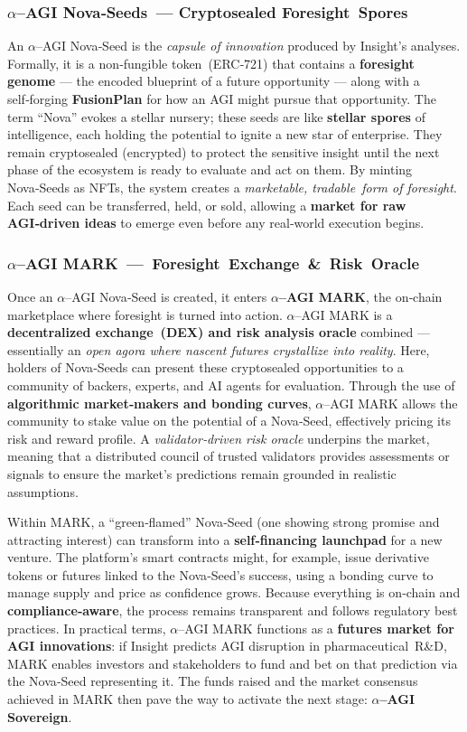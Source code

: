 \documentclass[12pt]{article}
\theoremstyle{plain}
\newcommand{\pdfmath}[2]{\texorpdfstring{$#1$}{#2}}
\newcommand{\AGIalpha}{\pdfmath{\alpha}{alpha}\nobreakdash--AGI\xspace}
\begin{document}
\subsubsection*{\AGIalpha Nova‑Seeds — Cryptosealed Foresight Spores}
An \AGIalpha Nova‑Seed is the \textit{capsule of innovation} produced by
Insight’s analyses.  Formally, it is a non‑fungible token (ERC‑721) that
contains a \textbf{foresight genome} — the encoded blueprint of a future
opportunity — along with a self‑forging \textbf{FusionPlan} for how an AGI
might pursue that opportunity.  The term “Nova” evokes a stellar nursery;
these seeds are like \textbf{stellar spores} of intelligence, each holding the
potential to ignite a new star of enterprise.  They remain cryptosealed
(encrypted) to protect the sensitive insight until the next phase of the
ecosystem is ready to evaluate and act on them.  By minting Nova‑Seeds as
NFTs, the system creates a \textit{marketable, tradable form of foresight}.
Each seed can be transferred, held, or sold, allowing a
\textbf{market for raw AGI‑driven ideas} to emerge even before any real‑world
execution begins.

\subsubsection*{\AGIalpha MARK — Foresight Exchange \& Risk Oracle}
Once an \AGIalpha Nova‑Seed is created, it enters \textbf{\AGIalpha MARK}, the
on‑chain marketplace where foresight is turned into action.  \AGIalpha MARK is
a \textbf{decentralized exchange (DEX) and risk analysis oracle} combined —
essentially an \textit{open agora where nascent futures crystallize into
reality}.  Here, holders of Nova‑Seeds can present these cryptosealed
opportunities to a community of backers, experts, and AI agents for
evaluation.  Through the use of \textbf{algorithmic market‑makers and bonding
curves}, \AGIalpha MARK allows the community to stake value on the potential
of a Nova‑Seed, effectively pricing its risk and reward profile.  A
\textit{validator‑driven risk oracle} underpins the market, meaning that a
distributed council of trusted validators provides assessments or signals to
ensure the market’s predictions remain grounded in realistic assumptions.

Within MARK, a “green‑flamed” Nova‑Seed (one showing strong promise and
attracting interest) can transform into a \textbf{self‑financing launchpad}
for a new venture.  The platform’s smart contracts might, for example, issue
derivative tokens or futures linked to the Nova‑Seed’s success, using a
bonding curve to manage supply and price as confidence grows.  Because
everything is on‑chain and \textbf{compliance‑aware}, the process remains
transparent and follows regulatory best practices.  In practical terms,
\AGIalpha MARK functions as a \textbf{futures market for AGI innovations}: if
Insight predicts AGI disruption in pharmaceutical R\&D, MARK enables investors
and stakeholders to fund and bet on that prediction via the Nova‑Seed
representing it.  The funds raised and the market consensus achieved in MARK
then pave the way to activate the next stage: \textbf{\AGIalpha Sovereign}.
\end{document}
